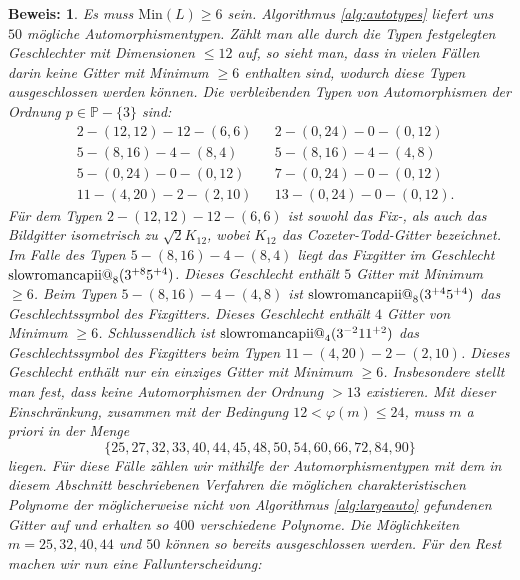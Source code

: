 \documentclass[12pt,a4paper,halfparskip,headsepline,bibtotocnumbered]{scrreprt}
\makeatletter
\theoremstyle{nummermitklammern}
\theoremstyle{nonumberbreak}
\newtheorem{beweis}{Beweis:}
\renewcommand{\P}{\mathbb{P}}
\newcommand{\Min}{\text{Min}}
\newcommand{\ii}{\text{\expandafter\@slowromancap\romannumeral 2@}}
\makeatother
\begin{document}
\begin{beweis}
	Es muss $\Min(L) \ge 6$ sein. Algorithmus \eqref{alg:autotypes} liefert uns $50$ mögliche Automorphismentypen. Zählt man alle durch die Typen festgelegten Geschlechter mit Dimensionen $\leq 12$ auf, so sieht man, dass in vielen Fällen darin keine Gitter mit Minimum $\geq 6$ enthalten sind, wodurch diese Typen ausgeschlossen werden können. Die verbleibenden Typen von Automorphismen der Ordnung $p \in \P - \lbrace 3 \rbrace$  sind:
	\begin{align*}
		&2 - (12, 12) - 12 - (6, 6)		&&2 - (0, 24) - 0 - (0, 12)\\
		&5 - (8, 16) - 4 - (8, 4)		&&5 - (8, 16) - 4 - (4, 8)\\
		&5 - (0, 24) - 0 - (0, 12)		&&7 - (0, 24) - 0 - (0, 12)\\
		&11 - (4, 20) - 2 - (2, 10)		&&13 - (0, 24) - 0 - (0, 12).
	\end{align*}
	Für dem Typen $2 - (12, 12) - 12 - (6, 6)$ ist sowohl das Fix-, als auch das Bildgitter isometrisch zu $\sqrt{2}K_{12}$, wobei $K_{12}$ das \textit{Coxeter-Todd-Gitter} bezeichnet. Im Falle des Typen $5 - (8, 16) - 4 - (8, 4)$ liegt das Fixgitter im Geschlecht $\ii_8(3^{+8} 5^{+4})$. Dieses Geschlecht enthält $5$ Gitter mit Minimum $\geq 6$. Beim Typen $5 - (8, 16) - 4 - (4, 8)$ ist $\ii_8(3^{+4}5^{+4})$ das Geschlechtssymbol des Fixgitters. Dieses Geschlecht enthält $4$ Gitter von Minimum $\geq 6$. Schlussendlich ist $\ii_4(3^{-2}11^{+2})$ das Geschlechtssymbol des Fixgitters beim Typen $11 - (4, 20) - 2 - (2, 10)$. Dieses Geschlecht enthält nur ein einziges Gitter mit Minimum $\geq 6$.
	Insbesondere stellt man fest, dass keine Automorphismen der Ordnung $>13$ existieren. Mit dieser Einschränkung, zusammen mit der Bedingung $12 < \varphi(m) \leq 24$, muss $m$ a priori in der Menge
	\begin{equation*}
		\lbrace 25, 27, 32, 33, 40, 44, 45, 48, 50, 54, 60, 66, 72, 84, 90\rbrace
	\end{equation*}
	liegen. Für diese Fälle zählen wir mithilfe der Automorphismentypen mit dem in diesem Abschnitt beschriebenen Verfahren die möglichen charakteristischen Polynome der möglicherweise nicht von Algorithmus \eqref{alg:largeauto} gefundenen Gitter auf und erhalten so $400$ verschiedene Polynome. Die Möglichkeiten $m = 25, 32, 40, 44$ und $50$ können so bereits ausgeschlossen werden. Für den Rest machen wir nun eine Fallunterscheidung:
	

\end{beweis}
\end{document}
